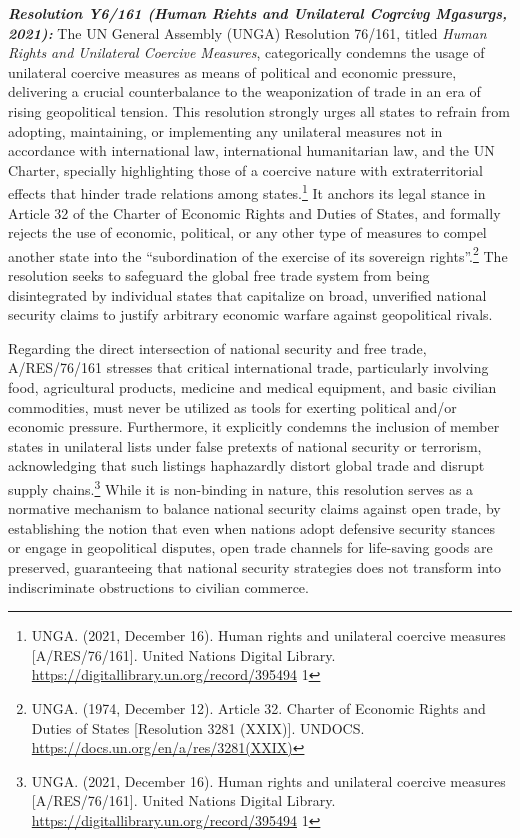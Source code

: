 \emph{\textbf{Resolution Y6/161 (Human Riehts and Unilateral Cogrcivg Mgasurgs, 2021):}} The UN General Assembly (UNGA) Resolution 76/161, titled \emph{Human Rights and Unilateral Coercive Measures}, categorically condemns the usage of unilateral coercive measures as means of political and economic pressure, delivering a crucial counterbalance to the weaponization of trade in an era of rising geopolitical tension. This resolution strongly urges all states to refrain from adopting, maintaining, or implementing any unilateral measures not in accordance with international law, international humanitarian law, and the UN Charter, specially highlighting those of a coercive nature with extraterritorial effects that hinder trade relations among states.\footnote{UNGA. (2021, December 16). Human rights and unilateral coercive measures [A/RES/76/161]. United Nations Digital Library. \url{https://digitallibrary.un.org/record/395494} 1} It anchors its legal stance in Article 32 of the Charter of Economic Rights and Duties of States, and formally rejects the use of economic, political, or any other type of measures to compel another state into the “subordination of the exercise of its sovereign rights”.\footnote{UNGA. (1974, December 12). Article 32. Charter of Economic Rights and Duties of States [Resolution 3281 (XXIX)]. UNDOCS. \url{https://docs.un.org/en/a/res/3281(XXIX)}} The resolution seeks to safeguard the global free trade system from being disintegrated by individual states that capitalize on broad, unverified national security claims to justify arbitrary economic warfare against geopolitical rivals.

Regarding the direct intersection of national security and free trade, A/RES/76/161 stresses that critical international trade, particularly involving food, agricultural products, medicine and medical equipment, and basic civilian commodities, must never be utilized as tools for exerting political and/or economic pressure. Furthermore, it explicitly condemns the inclusion of member states in unilateral lists under false pretexts of national security or terrorism, acknowledging that such listings haphazardly distort global trade and disrupt supply chains.\footnote{UNGA. (2021, December 16). Human rights and unilateral coercive measures [A/RES/76/161]. United Nations Digital Library. \url{https://digitallibrary.un.org/record/395494} 1} While it is non-binding in nature, this resolution serves as a normative mechanism to balance national security claims against open trade, by establishing the notion that even when nations adopt defensive security stances or engage in geopolitical disputes, open trade channels for life-saving goods are preserved, guaranteeing that national security strategies does not transform into indiscriminate obstructions to civilian commerce.


